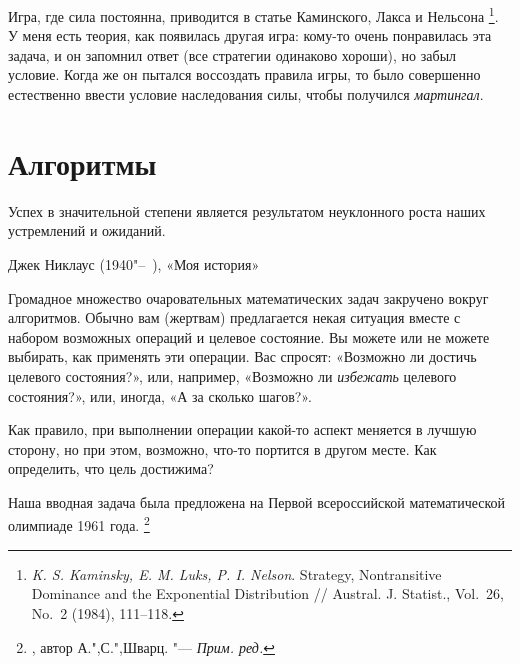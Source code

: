 \documentclass[twoside]{book}
\begin{document}
Игра, где сила постоянна, приводится в статье Каминского, Лакса и Нельсона%
\footnote{\emph{K. S. Kaminsky, E. M. Luks, P. I. Nelson}. Strategy, Nontransitive Dominance and the Exponential Distribution /\!/ {Austral. J. Statist.}, Vol.~26, No.~2 (1984), 111--118.}.
У меня есть теория, как появилась другая игра: кому-то очень понравилась эта задача, и он запомнил ответ (все стратегии одинаково хороши), но забыл условие.
Когда же он пытался воссоздать правила игры, то было совершенно естественно ввести условие наследования силы, чтобы получился \emph{мартингал}.



\chapter{Алгоритмы}


\setlength{\epigraphwidth}{.65\textwidth}
\epigraph{Успех в значительной степени является результатом неуклонного роста наших устремлений и ожиданий.\vspace{1ex}}{Джек Никлаус (1940"--~), «Моя история»}



Громадное множество очаровательных математических задач закручено вокруг алгоритмов.
Обычно вам (жертвам) %
предлагается некая ситуация вместе с набором возможных операций и целевое состояние.
Вы можете или не можете выбирать, как применять эти операции.
Вас спросят: «Возможно ли достичь целевого состояния?», или, например, «Возможно ли \emph{избежать} целевого состояния?», или, иногда, «А за сколько шагов?».

Как правило, при выполнении операции какой-то аспект меняется в лучшую сторону, но при этом, возможно, что-то портится в другом месте.
Как определить, что цель достижима?

Наша вводная задача была предложена на Первой всероссийской математической олимпиаде 1961 года.%
\footnote{ \cite[№7]{ВсМО}, автор А.",С.",Шварц. "--- \emph{Прим. ред.}}
\end{document}
